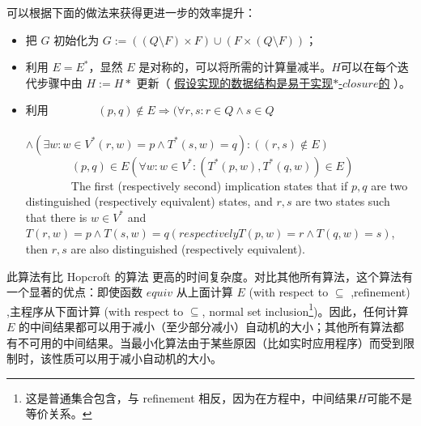 可以根据下面的做法来获得更进一步的效率提升：
\begin{itemize}
    \item 把 $G$ 初始化为 $ G := ( (Q\setminus F) \times F ) \cup ( F \times ( Q \setminus F ) ) $；
    \item 利用 $E=E^*$，显然 $E$ 是对称的，可以将所需的计算量减半。$H$可以在每个迭代步骤中由 $H := H*$ 更新（ \underline{假设实现的数据结构是易于实现$*$-$closure$的} ）。
    \item 利用 
    \newline
    \mbox{　　　　}$ (p,q) \notin E  \Rightarrow ( \forall r,s:r\in Q \land s \in Q $\\
    \mbox{　　　　　　　　}$\land (\exists w:w\in V^* (r,w) = p \land T^* (s,w) = q): ((r,s) \not\in E )$ \\
    \mbox{　　　　}$ (p,q) \in E (\forall w:w\in V^* : (T^*(p,w),T^*(q,w))\in E)$ \\
    \mbox{　　　　}The first (respectively second) implication states that if $p,q$ are two distinguished (respectively equivalent) states, and $r,s$ are two states such that there is $w \in V^*  $ and $ T(r,w) = p \land T(s,w) = q (respectively T(p,w) = r \land T (q,w) = s ) $, then $r,s$ are also distinguished (respectively equivalent).
\end{itemize}

此算法有比 Hopcroft 的算法 \cite{Hopc71,Grie73} 更高的时间复杂度。对比其他所有算法，这个算法有一个显著的优点：即使函数 $equiv$ 从上面计算 $E$ (with respect to $\subseteq$ ,refinement) ,主程序从下面计算 (with respect to $ \subseteq $, normal set inclusion\footnote{这是普通集合包含，与 refinement 相反，因为在方程中，中间结果$H$可能不是等价关系。})。因此，任何计算 $E$ 的中间结果都可以用于减小（至少部分减小）自动机的大小；其他所有算法都有不可用的中间结果。当最小化算法由于某些原因（比如实时应用程序）而受到限制时，该性质可以用于减小自动机的大小。
